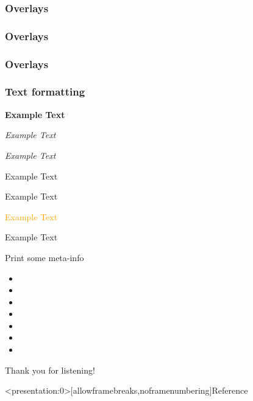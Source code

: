 \documentclass{beamer}
\begin{document}
\begin{frame}
	\frametitle{Overlays}


\end{frame}

\begin{frame}
	\frametitle{Overlays}


\end{frame}

\begin{frame}
	\frametitle{Overlays}


\end{frame}


\begin{frame}
	\frametitle{Text formatting}
	\textbf<2>{Example Text}

	\textit<2>{Example Text}

	\textsl<2>{Example Text}

	\textrm<2>{Example Text}

	\textsf<2>{Example Text}

	\textcolor<2>{orange}{Example Text}

	\alert<2>{Example Text}

\end{frame}

\begin{frame}{Print some meta-info}
	\begin{itemize}
		\item \insertframenumber
		\item \insertauthor
		\item \insertinstitute
		\item \insertshortauthor
		\item \insertshortinstitute
		\item \inserttitle
		\item \insertshorttitle
	\end{itemize}
\end{frame}

\begin{frame}
\begin{center}
	\large
	Thank you for listening!
\end{center}
\end{frame}



\begin{frame}<presentation:0>[allowframebreaks,noframenumbering]{Reference}
	
	
\end{frame}
\end{document}
